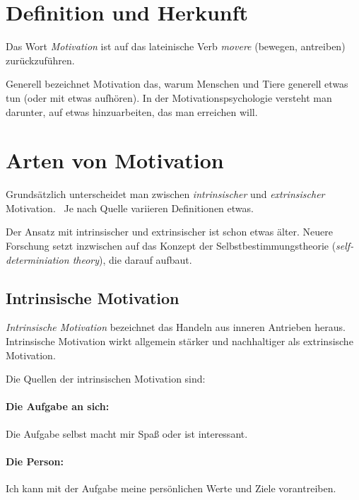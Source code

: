 \section{Definition und Herkunft}

Das Wort \emph{Motivation} ist auf das lateinische Verb \emph{movere} (bewegen, antreiben) zurückzuführen.~\cite{duden-herkunft}

Generell bezeichnet Motivation das, warum Menschen und Tiere generell etwas tun (oder mit etwas aufhören). In der Motivationspsychologie versteht man darunter, auf etwas hinzuarbeiten, das man erreichen will. \cite{rheinberg-motivation}

\section{Arten von Motivation}

Grundsätzlich unterscheidet man zwischen \emph{intrinsischer} und \emph{extrinsischer} Motivation.~\cite{self-determiniation-theory, pelz-motivation} Je nach Quelle variieren Definitionen etwas.

Der Ansatz mit intrinsischer und extrinsischer ist schon etwas älter. Neuere Forschung setzt inzwischen auf das Konzept der Selbstbestimmungstheorie (\emph{self-determiniation theory}), die darauf aufbaut.


\subsection{Intrinsische Motivation}
\label{intrinsische-motivation}

\emph{Intrinsische Motivation} bezeichnet das Handeln aus inneren Antrieben heraus. Intrinsische Motivation wirkt allgemein stärker und nachhaltiger als extrinsische Motivation.

Die Quellen der intrinsischen Motivation sind:

\paragraph{Die Aufgabe an sich:} Die Aufgabe selbst macht mir Spaß oder ist interessant.

\paragraph{Die Person:} Ich kann mit der Aufgabe meine persönlichen Werte und Ziele vorantreiben.

